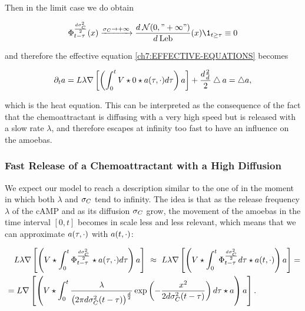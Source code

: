 Then in the limit case we do obtain

\begin{equation*}
		\heatkernel_{t-\tau}^{\frac{d\sigma_\camp^2}{2}}(x)
	\xrightarrow{\diffusion_\camp \rightarrow +\infty}
		\frac{d\: \Normal(0, "+\infty")}{d\:\lebsge} (x)
		\1_{t\geq \tau} 
		\equiv
		0
\end{equation*}

and therefore the effective equation \ref{ch7:EFFECTIVE-EQUATIONS} becomes

\begin{equation*}\label{conc:sigmaC-goes-infty}
	\partial_t a =  L\lambda \nabla \left[ \left( \int_0^t
	V \star 0 \star a(\tau, \cdot) 
	d \tau
	\right)
	a
	\right]
	+ \frac{d \frac{2}{d}}{2} \bigtriangleup a
	=
	\bigtriangleup a,
\end{equation*}

which is the heat equation.
This can be interpreted as the consequence of the fact that the chemoattractant is diffusing with a very high speed but is released with a slow rate $\lambda$, and therefore escapes at infinity too fast to have an influence on the amoebas.

\subsubsection{Fast Release of a Chemoattractant with a High Diffusion}

We expect our model to reach a description similar to the one of \cite{ana} in the moment in which both $\lambda$ and $\sigma_C$ tend to infinity.
The idea is that as the release frequency $\lambda$ of the cAMP and as its diffusion $\sigma_C$ grow, the movement of the amoebas in the time interval $[0,t]$ becomes in scale less and less relevant, which means that we can approximate $a(\tau, \cdot)$ with $a(t,\cdot)$:

\begin{align*}
	&\quad
		 L\lambda \nabla \left[ \left(
		V
		\star	
		\int_0^t
		\Phi_{t-\tau}^{\frac{d\sigma_C^2}{2}} 
		\star a(\tau, \cdot) 
		d \tau
		\right)
		a
		\right]\
	\approx\
		L\lambda \nabla \left[ \left(
		V
		\star	
		\int_0^t
		\Phi_{t-\tau}^{\frac{d\sigma_C^2}{2}} 
		d \tau
		\star a(t, \cdot) 
		\right)
		a
		\right]
		=
	\\
	&=
		L \nabla \left[ \left( 
		V \star 
		\int_0^t
		\frac{\lambda}{
			\big( 2\pi d\sigma_C^2 (t-\tau) \big)^{\frac{d}{2}}
		}
		\exp \left(
		-\frac{x^2}{2 d\sigma_C^2 (t-\tau)}
		\right)
		d \tau
		\star a
		\right)
		a
		\right].
\end{align*}


